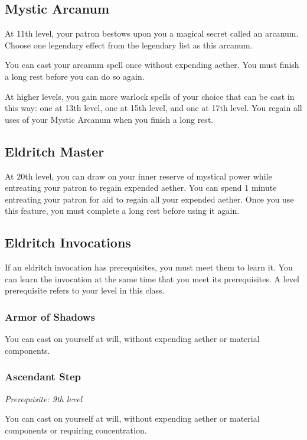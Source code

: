 \subsection{Mystic Arcanum}

At 11th level, your patron bestows upon you a magical secret called an arcanum. Choose one legendary effect from the legendary list as this arcanum.

You can cast your arcanum spell once without expending aether. You must finish a long rest before you can do so again.

At higher levels, you gain more warlock spells of your choice that can be cast in this way: one at 13th level, one at 15th level, and one at 17th level. You regain all uses of your Mystic Arcanum when you finish a long rest.

\subsection{Eldritch Master}

At 20th level, you can draw on your inner reserve of mystical power while entreating your patron to regain expended aether. You can spend 1 minute entreating your patron for aid to regain all your expended aether. Once you use this feature, you must complete a long rest before using it again.

\subsection{Eldritch Invocations}

If an eldritch invocation has prerequisites, you must meet them to learn it. You can learn the invocation at the same time that you meet its prerequisites. A level prerequisite refers to your level in this class.

\subsubsection{Armor of Shadows}

You can cast  on yourself at will, without expending aether or material components.

\subsubsection{Ascendant Step}

\textit{Prerequisite: 9th level}

You can cast  on yourself at will, without expending aether or material components or requiring concentration.

